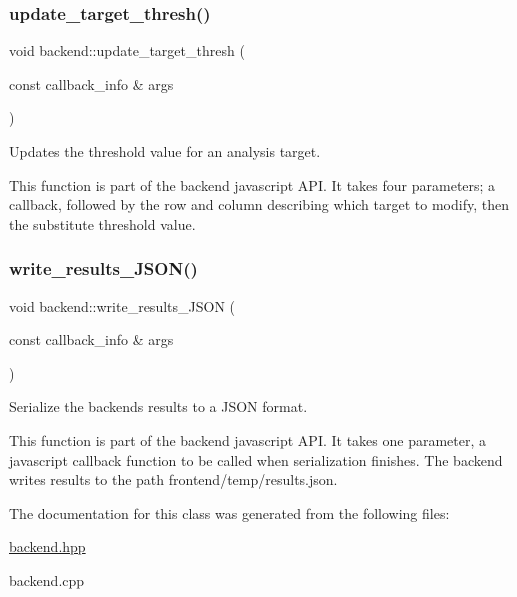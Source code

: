 \subsubsection{\texorpdfstring{update\+\_\+target\+\_\+thresh()}{update\_target\_thresh()}}
{\footnotesize\ttfamily void backend\+::update\+\_\+target\+\_\+thresh (\begin{DoxyParamCaption}\item[{const callback\+\_\+info \&}]{args }\end{DoxyParamCaption})\hspace{0.3cm}{\ttfamily [static]}}



Updates the threshold value for an analysis target. 

This function is part of the backend javascript A\+PI. It takes four parameters; a callback, followed by the row and column describing which target to modify, then the substitute threshold value. \mbox{\label{classbackend_a91fe1ff0bbdc9e29d6958e0cf72d10ba}} 
\subsubsection{\texorpdfstring{write\+\_\+results\+\_\+\+J\+S\+O\+N()}{write\_results\_JSON()}}
{\footnotesize\ttfamily void backend\+::write\+\_\+results\+\_\+\+J\+S\+ON (\begin{DoxyParamCaption}\item[{const callback\+\_\+info \&}]{args }\end{DoxyParamCaption})\hspace{0.3cm}{\ttfamily [static]}}



Serialize the backend\textquotesingle{}s results to a J\+S\+ON format. 

This function is part of the backend javascript A\+PI. It takes one parameter, a javascript callback function to be called when serialization finishes. The backend writes results to the path frontend/temp/results.\+json. 

The documentation for this class was generated from the following files\+:\begin{DoxyCompactItemize}
\item 
\hyperlink{backend_8hpp}{backend.\+hpp}\item 
backend.\+cpp\end{DoxyCompactItemize}
